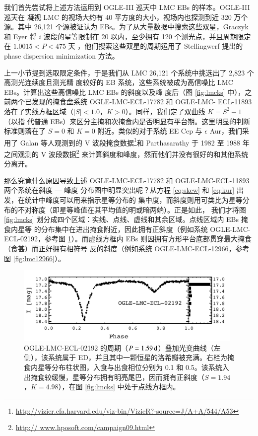 我们首先尝试将上述方法运用到 OGLE-III 巡天中 LMC EBs 的样本\cite{Graczyk2011}。OGLE-III 巡天在
凝视 LMC 的视场大约有 40 平方度的大小，视场内也探测到近 320 万个源\cite{Ulaczyk2012}。其中 
26,121 个源被证认为 EBs\cite{Graczyk2011}。为了从大量数据中搜索这些双星，Graczyk 和 Eyer 将 $i$ 
波段的星等限制在 20 以内，至少拥有 120 个测光点，并且周期限定在 $1.0015 < P< 475$ 天
\cite{Graczyk2010}，他们搜索这些双星的周期运用了 Stellingwerf 提出的 phase dispersion minimization 
方法\cite{Stellingwerf1978}。

上一小节提到选取限定条件，于是我们从 LMC 26,121 个系统中挑选出了 2,823 个高测光连续度且测光精
度较好的 EB 系统，这些系统被成为高信噪比 LMC EBs。计算出这些高信噪比 LMC EBs 的斜度以及峰
度后（图 \ref{fig:lmcks} 中），之前两个已发现的掩食盘系统 OGLE-LMC-ECL-17782 和 OGLE-LMC-
ECL-11893 落在了实线方框区域（$|S| < 1.0$，$K > 0$）。同样，我们定了双曲线 $K = S^2 - 1$（以指
代普通 EBs）来区分主掩和次掩食内是否明显有平台期。这里明显的判断标准则落在了 $S = 0$ 和 $K = 
0$ 附近。类似的对于系统 EE Cep 与  $\epsilon$ Aur，我们采用了 Galan 等人\cite{Galan2012}观测到的 
V 波段掩食数据\footnote{\url{http://vizier.cfa.harvard.edu/viz-bin/VizieR?-source=J/A+A/544/A53}}和 
Parthasarathy 于 1982 至 1988 年之间\cite{Parthasarathy1986}观测的 V 波段数据\footnote{\url{http://
www.hposoft.com/campaign09.html}} 来计算斜度和峰度，然而他们并没有很好的和其他系统分离开。

那么究竟什么原因导致上述 OGLE-LMC-ECL-17782 和 OGLE-LMC-ECL-11893 两个系统在斜度 --- 峰度
分布图中明显突出呢？从方程 \ref{eq:skew} 和 \ref{eq:kur} 出发，在统计中峰度可以用来指示星等分布的
集中度，而斜度则用可类比为星等分布的不对称度（即星等峰值在其平均值的明或暗两端）。正是如此，
我们才将图 \ref{fig:lmcks} 划分成四个区域：实线、点线、虚线和其余区域。点线区域内 EBs 掩食内星等
的分布集中在进出掩食附近，因此拥有正斜度（例如系统 OGLE-LMC-ECL-02192，参考图 
\ref{fig:lmc02192}）。而虚线方框内 EBs 则因拥有方形平台底部贯穿最大掩食（食甚）而正好拥有相符号
反的斜度（例如系统 OGLE-LMC-ECL-12966，参考图 \ref{fig:lmc12966}）。

\begin{figure}[t]
\centering
\includegraphics[width=0.98\textwidth,trim={0.0in 0.2in 0 0}]{figures/chapter3/f6_lmc02192.pdf}
\caption{OGLE-LMC-ECL-02192 的周期（$P = 1.59\, \mathrm{d}$）叠加光变曲线（左侧），该系统属于 ED，并且其中一颗恒星的洛希瓣被充满。右栏为掩食内星等分布柱状图，入食与出食相位分别为 0.1 和 0.5。该系统入出掩食较缓慢，星等分布拥有明亮尾巴，因而拥有正斜度（$S=1.94$，$K=4.98$），在图 \ref{fig:lmcks} 中处于点线方框内。}
\label{fig:lmc02192}
\end{figure}

